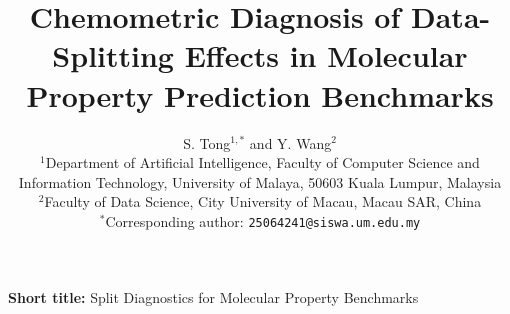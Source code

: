 \documentclass[11pt]{article}
\title{Chemometric Diagnosis of Data-Splitting Effects in Molecular Property Prediction Benchmarks}
\author{
\begin{minipage}{0.94\textwidth}
\centering
S. Tong$^{1,*}$ and Y. Wang$^{2}$\\[0.45em]
\small $^{1}$Department of Artificial Intelligence, Faculty of Computer Science and Information Technology, University of Malaya, 50603 Kuala Lumpur, Malaysia\\
\small $^{2}$Faculty of Data Science, City University of Macau, Macau SAR, China\\[0.30em]
\small $^{*}$Corresponding author: \texttt{25064241@siswa.um.edu.my}
\end{minipage}
}
\date{}
\begin{document}
\maketitle
\begin{center}
\small\textbf{Short title:} Split Diagnostics for Molecular Property Benchmarks
\end{center}












\end{document}
